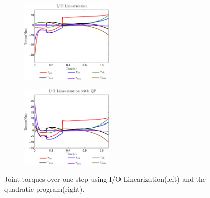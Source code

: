 \begin{figure}[t!]
\centering
\begin{subfigure}{0.75\textwidth}
\hspace{-5mm}
\includegraphics[width=44mm]{figures/TORK_IO-crop.pdf}
\end{subfigure}
\begin{subfigure}{0.001\textwidth}
\vspace{-39mm}
\includegraphics[width=44mm]{figures/TORK_QP-crop.pdf}
\end{subfigure}
\caption[Plots comparing joint torques from I/O Linearization and the QP.]{Joint torques over one step using I/O Linearization(left) and the quadratic program(right).}
\label{fig:Torques}
\end{figure}

